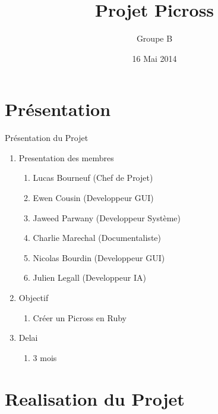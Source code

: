 \documentclass[12pt]{beamer}
\title {Projet Picross}
\author{Groupe B}
\date{16 Mai 2014}
\institute{Université du Maine}
\begin{document}
\maketitle


\begin{frame}{}
  \tableofcontents
\end{frame}
   



\section{Présentation}


\begin{frame}{Présentation du Projet}
    \begin{enumerate}
      \item Presentation des membres
        \begin{enumerate}
        \item Lucas Bourneuf   (Chef de Projet)
        \item Ewen Cousin      (Developpeur GUI)
        \item Jaweed Parwany   (Developpeur Système)
        \item Charlie Marechal (Documentaliste)
        \item Nicolas Bourdin  (Developpeur GUI)
        \item Julien Legall    (Developpeur IA)
        \end{enumerate}\pause
      \item Objectif
        \begin{enumerate}
        \item  Créer un Picross en Ruby
        \end{enumerate}\pause
      \item Delai
        \begin{enumerate}
        \item 3 mois
        \end{enumerate}
    \end{enumerate}\pause
\end{frame}


\section{Realisation du Projet}
\end{document}

